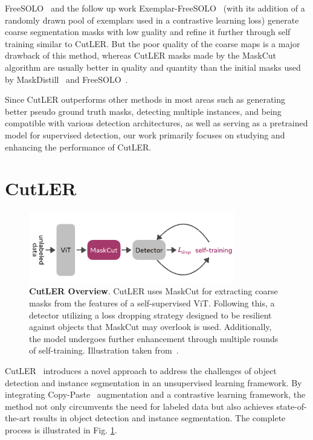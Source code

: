 FreeSOLO~\cite{wang2022freesolo} and the follow up work Exemplar-FreeSOLO~\cite{Ishtiak_2023_CVPR} (with its addition of a randomly drawn pool of exemplars used in a contrastive learning loss) generate coarse segmentation masks with low guality and refine it further through self training similar to CutLER. But the poor quality of the coarse maps is a major drawback of this method, whereas CutLER masks made by the MaskCut~\cite{wang2023cut, wang2022tokencut} algorithm are usually better in quality and quantity than the initial masks used by MaskDistill~\cite{vangansbeke2022discovering} and FreeSOLO~\cite{wang2022freesolo}. 

Since CutLER outperforms other methods in most areas such as generating better pseudo ground truth masks, detecting multiple instances, and being compatible with various detection architectures, as well as serving as a pretrained model for supervised detection, our work primarily focuses on studying and enhancing the performance of CutLER.

\section{CutLER}
\begin{figure}
	\centering
	\includegraphics[width=0.8\textwidth]{Images/main/cutler_flow.png}
	\caption[\textbf{CutLER Overview}]{\textbf{CutLER Overview}. CutLER uses MaskCut for extracting coarse masks from the features of a self-supervised ViT. Following this, a detector utilizing a loss dropping strategy designed to be resilient against objects that MaskCut may overlook is used. Additionally, the model undergoes further enhancement through multiple rounds of self-training. Illustration taken from~\cite{wang2023cut}.}
	\label{fig:cutler_flow}
\end{figure} 

CutLER~\cite{wang2023cut} introduces a novel approach to address the challenges of object detection and instance segmentation in an unsupervised learning framework. By integrating Copy-Paste~\cite{ghiasi2021simplecopypastestrongdata} augmentation and a contrastive learning framework, the method not only circumvents the need for labeled data but also achieves state-of-the-art results in object detection and instance segmentation. The complete process is illustrated in Fig. \ref{fig:cutler_flow}.
 
